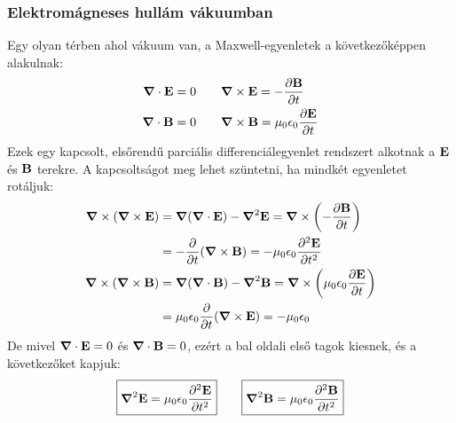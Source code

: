 \documentclass[a4paper,12pt]{article}
\begin{document}
\subsubsection{Elektromágneses hullám vákuumban}
Egy olyan térben ahol vákuum van, a Maxwell-egyenletek a következőképpen alakulnak:
\begin{equation}
    \begin{aligned}
        \boldsymbol{\nabla} \cdot \bold{E} &= 0 \qquad \boldsymbol{\nabla} \times \bold{E} = -\frac{\partial \bold{B}}{\partial t} \\
        \boldsymbol{\nabla} \cdot \bold{B} &= 0 \qquad \boldsymbol{\nabla} \times \bold{B} = \mu_0 \epsilon_0 \frac{\partial \bold{E}}{\partial t} 
    \end{aligned}
\end{equation}
Ezek egy kapcsolt, elsőrendű parciális differenciálegyenlet rendszert alkotnak a $\bold{E}$ és $\bold{B}$ terekre. A kapcsoltságot meg lehet szüntetni, ha mindkét egyenletet rotáljuk:
\begin{equation}
    \begin{aligned}
        \boldsymbol{\nabla} \times (\boldsymbol{\nabla} \times \bold{E}) &= \boldsymbol{\nabla} (\boldsymbol{\nabla} \cdot \bold{E}) - \boldsymbol{\nabla}^2 \bold{E} = \boldsymbol{\nabla} \times \left(-\frac{\partial \bold{B}}{\partial t}\right) \\
        &= -\frac{\partial}{\partial t} (\boldsymbol{\nabla} \times \bold{B}) = -\mu_0 \epsilon_0 \frac{\partial^2 \bold{E}}{\partial t^2} \\
        \boldsymbol{\nabla} \times (\boldsymbol{\nabla} \times \bold{B}) &= \boldsymbol{\nabla} (\boldsymbol{\nabla} \cdot \bold{B}) - \boldsymbol{\nabla}^2 \bold{B} = \boldsymbol{\nabla} \times \left( \mu_0 \epsilon_0 \frac{\partial \bold{E}}{\partial t} \right) \\
        &= \mu_0 \epsilon_0 \frac{\partial}{\partial t} (\boldsymbol{\nabla} \times \bold{E}) = -\mu_0 \epsilon_0
    \end{aligned}
\end{equation}
De mivel $\boldsymbol{\nabla} \cdot \bold{E} = 0$ és $\boldsymbol{\nabla} \cdot \bold{B} = 0$, ezért a bal oldali első tagok kiesnek, és a következőket kapjuk:
\begin{equation}
    \boxed{\boldsymbol{\nabla}^2 \bold{E} = \mu_0 \epsilon_0 \frac{\partial^2 \bold{E}}{\partial t^2}} \qquad \boxed{\boldsymbol{\nabla}^2 \bold{B} = \mu_0 \epsilon_0 \frac{\partial^2 \bold{B}}{\partial t^2}}
\end{equation}
\end{document}
